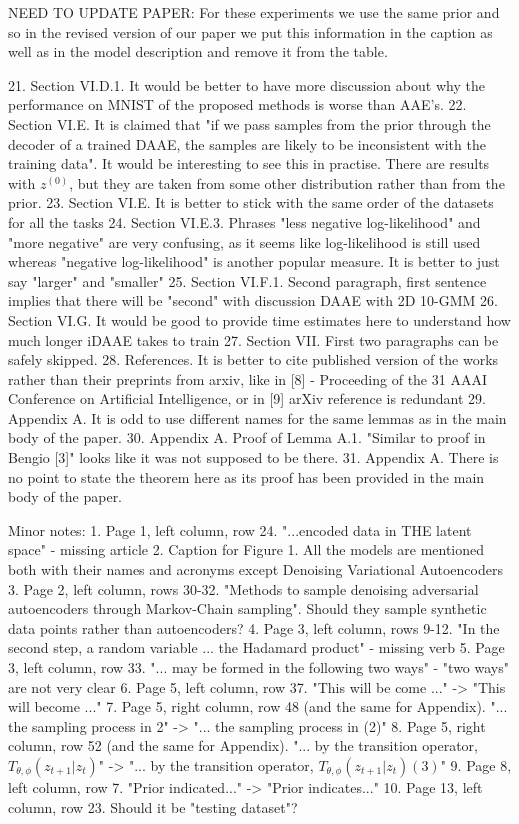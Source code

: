 \documentclass{article}
\begin{document}
{\color{red} NEED TO UPDATE PAPER: For these experiments we use the same prior and so in the revised version of our paper we put this information in the caption as well as in the model description and remove it from the table.}


21. Section VI.D.1. It would be better to have more discussion about why the performance on MNIST of the proposed methods is worse than AAE's.
22. Section VI.E. It is claimed that "if we pass samples from the prior through the decoder of a trained DAAE, the samples are likely to be inconsistent with the training data". It would be interesting to see this in practise. There are results with $z^{(0)}$, but they are taken from some other distribution rather than from the prior.
23. Section VI.E. It is better to stick with the same order of the datasets for all the tasks
24. Section VI.E.3. Phrases "less negative log-likelihood" and "more negative" are very confusing, as it seems like log-likelihood is still used whereas "negative log-likelihood" is another popular measure. It is better to just say "larger" and "smaller"
25. Section VI.F.1. Second paragraph, first sentence implies that there will be "second" with discussion DAAE with 2D 10-GMM
26. Section VI.G. It would be good to provide time estimates here to understand how much longer iDAAE takes to train
27. Section VII. First two paragraphs can be safely skipped.
28. References. It is better to cite published version of the works rather than their preprints from arxiv, like in [8] - Proceeding of the 31 AAAI Conference on Artificial Intelligence, or in [9] arXiv reference is redundant
29. Appendix A. It is odd to use different names for the same lemmas as in the main body of the paper.
30. Appendix A. Proof of Lemma A.1. "Similar to proof in Bengio [3]" looks like it was not supposed to be there.
31. Appendix A. There is no point to state the theorem here as its proof has been provided in the main body of the paper. 

Minor notes:
1. Page 1, left column, row 24. "...encoded data in THE latent space" - missing article
2. Caption for Figure 1. All the models are mentioned both with their names and acronyms except Denoising Variational Autoencoders
3. Page 2, left column, rows 30-32. "Methods to sample denoising adversarial autoencoders through Markov-Chain sampling". Should they sample synthetic data points rather than autoencoders?
4. Page 3, left column, rows 9-12. "In the second step, a random variable ... the Hadamard product" - missing verb
5. Page 3, left column, row 33. "... may be formed in the following two ways" - "two ways" are not very clear
6. Page 5, left column, row 37. "This will be come ..." -> "This will become ..."
7. Page 5, right column, row 48 (and the same for Appendix). "... the sampling process in 2" -> "... the sampling process in (2)"
8. Page 5, right column, row 52 (and the same for Appendix). "... by the transition operator, $T_{\theta, \phi}(z_{t+1}|z_t)$" -> "... by the transition operator, $T_{\theta, \phi}(z_{t+1}|z_t) (3)$"
9. Page 8, left column, row 7. "Prior indicated..." -> "Prior indicates..."
10. Page 13, left column, row 23. Should it be "testing dataset"?
\end{document}

